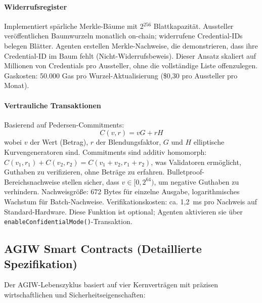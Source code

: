 \documentclass[11pt]{article}
\begin{document}
\paragraph{Widerrufsregister} Implementiert spärliche Merkle-Bäume mit 2$^{256}$ Blattkapazität. Aussteller veröffentlichen Baumwurzeln monatlich on-chain; widerrufene Credential-IDs belegen Blätter. Agenten erstellen Merkle-Nachweise, die demonstrieren, dass ihre Credential-ID im Baum fehlt (Nicht-Widerrufsbeweis). Dieser Ansatz skaliert auf Millionen von Credentials pro Aussteller, ohne die vollständige Liste offenzulegen. Gaskosten: 50.000 Gas pro Wurzel-Aktualisierung (\$0,30 pro Aussteller pro Monat).

\paragraph{Vertrauliche Transaktionen} Basierend auf Pedersen-Commitments:
\begin{equation}
C(v, r) = vG + rH
\end{equation}
wobei $v$ der Wert (Betrag), $r$ der Blendungsfaktor, $G$ und $H$ elliptische Kurvengeneratoren sind. Commitments sind additiv homomorph: $C(v_1, r_1) + C(v_2, r_2) = C(v_1 + v_2, r_1 + r_2)$, was Validatoren ermöglicht, Guthaben zu verifizieren, ohne Beträge zu erfahren. Bulletproof-Bereichsnachweise stellen sicher, dass $v \in [0, 2^{64})$, um negative Guthaben zu verhindern. Nachweisgröße: 672 Bytes für einzelne Ausgabe, logarithmisches Wachstum für Batch-Nachweise. Verifikationskosten: ca. 1,2~ms pro Nachweis auf Standard-Hardware. Diese Funktion ist optional; Agenten aktivieren sie über \texttt{enableConfidentialMode()}-Transaktion.

\subsection{AGIW Smart Contracts (Detaillierte Spezifikation)}
\label{sec:agiw-contracts}
Der AGIW-Lebenszyklus basiert auf vier Kernverträgen mit präzisen wirtschaftlichen und Sicherheitseigenschaften:
\end{document}

